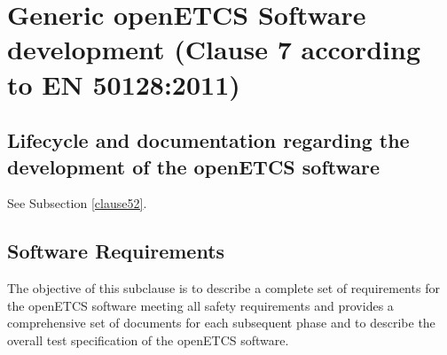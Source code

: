 \documentclass{template/openetcs_report}
\begin{document}
\section{Generic openETCS Software development (Clause 7 according to EN 50128:2011)}
\label{clause72}
\subsection{Lifecycle and documentation regarding the development of the openETCS software}
See Subsection \ref{clause52}.


\subsection{Software Requirements}
\label{req-sw}
\begin{flushleft}
The objective of this subclause is to describe a complete set of requirements for the openETCS software meeting all safety requirements and provides a comprehensive set of documents for each subsequent phase and to describe the overall test specification of the openETCS software.
\end{flushleft}
\end{document}
